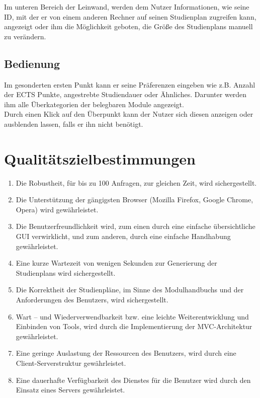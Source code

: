 \documentclass[parskip=full]{scrartcl}
\def\threedigits#1{%
	\ifnum#1<10 0\fi 
	\number#1}
\begin{document}
			Im unteren Bereich der Leinwand, werden dem Nutzer Informationen, wie seine ID, mit der er von einem anderen Rechner auf seinen Studienplan zugreifen kann, angezeigt oder ihm die Möglichkeit geboten, die Größe des Studienplans manuell zu verändern.
	
		\subsection{Bedienung}
			Im gesonderten ersten Punkt kann er seine Präferenzen eingeben wie z.B. Anzahl der ECTS Punkte, angestrebte Studiendauer oder Ähnliches. Darunter werden ihm alle Überkategorien der belegbaren Module angezeigt.\\
			Durch einen Klick auf den Überpunkt kann der Nutzer sich diesen anzeigen oder ausblenden lassen, falls er ihn nicht benötigt.
	
	\section{Qualitätszielbestimmungen}
	
		\begin{enumerate}[label=/Q\protect\threedigits{\theenumi}0/]
			\item Die Robustheit, für bis zu 100 Anfragen, zur gleichen Zeit, wird sichergestellt.
			\item Die Unterstützung der gängigsten Browser (Mozilla Firefox, Google Chrome, Opera) wird gewährleistet.
			\item Die Benutzerfreundlichkeit wird, zum einen durch eine einfache übersichtliche GUI verwirklicht, und zum anderen, durch eine einfache Handhabung gewährleistet.
			\item Eine kurze Wartezeit von wenigen Sekunden zur Generierung der Studienplans wird sichergestellt.
			\item Die Korrektheit der Studienpläne, im Sinne des Modulhandbuchs und der Anforderungen des Benutzers, wird sichergestellt.
			\item Wart – und Wiederverwendbarkeit bzw. eine leichte Weiterentwicklung und Einbinden von Tools, wird durch die Implementierung der MVC-Architektur gewährleistet.
			\item Eine geringe Auslastung der Ressourcen des Benutzers, wird durch eine Client-Serverstruktur gewährleistet.
			\item Eine dauerhafte Verfügbarkeit des Dienstes für die Benutzer wird durch den Einsatz eines Servers gewährleistet.
		\end{enumerate}
		
\end{document}
